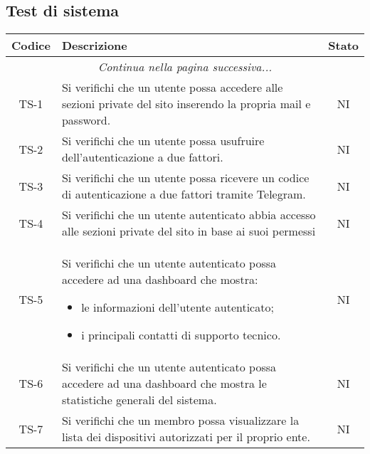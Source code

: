 	\subsection{Test di sistema}
		\begin{center}
			\begin{longtable}{|c|p{10cm}|c|}
			\hline
			\rowcolor{lighter-grayer}
			\textbf{Codice} & \textbf{Descrizione} & \textbf{Stato}  \\
			\hline
			\endhead
			\hline
	        \multicolumn{3}{|c|}{\textit{Continua nella pagina successiva...}}\\
	        \hline
	        \endfoot
	        \endlastfoot

			\hline
			 TS-1 & Si verifichi che un utente possa accedere alle sezioni private del sito inserendo la propria mail e password.
			  & NI \\
			 \hline
			 TS-2 & Si verifichi che un utente possa usufruire dell'autenticazione a due fattori. & NI \\
			 \hline
			 TS-3 & Si verifichi che un utente possa ricevere un codice di autenticazione a due fattori tramite Telegram. & NI \\
			 \hline
			 TS-4 & Si verifichi che un utente autenticato abbia accesso alle sezioni private del sito in base ai suoi permessi & NI \\
			 \hline
			 TS-5 & Si verifichi che un utente autenticato possa accedere ad una dashboard che mostra:
			 \begin{itemize}
			 	\item le informazioni dell'utente autenticato;
			 	\item i principali contatti di supporto tecnico.
			 \end{itemize} & NI \\
			 \hline
			 TS-6 & Si verifichi che un utente autenticato possa accedere ad una dashboard che mostra le statistiche generali del sistema. & NI \\
			 \hline
			 TS-7 & Si verifichi che un membro possa visualizzare la lista dei dispositivi autorizzati per il proprio ente. & NI \\
			 \hline

\end{longtable}
\end{center}
